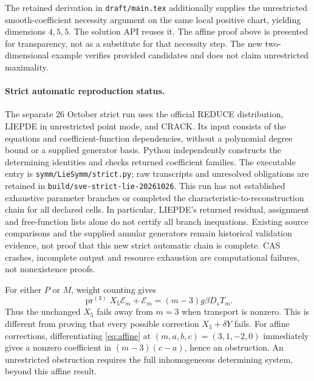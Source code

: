 \documentclass[11pt,a4paper,oneside]{report}
\numberwithin{equation}{chapter}
\newcommand{\E}{\mathcal E}
\newcommand{\pr}{\operatorname{pr}}
\DeclareRobustCommand{\code}[1]{\nolinkurl{#1}}
\begin{document}
The retained derivation in \code{draft/main.tex} additionally supplies the
unrestricted smooth-coefficient necessity argument on the same local positive
chart, yielding dimensions $4,5,5$. The solution API reuses it. The affine
proof above is presented for transparency, not as a substitute for that
necessity step. The new two-dimensional example verifies provided candidates
and does not claim unrestricted maximality.

\paragraph{Strict automatic reproduction status.}
The separate 26 October strict run uses the official REDUCE distribution,
LIEPDE in unrestricted point mode, and CRACK. Its input consists of the
equations and coefficient-function dependencies, without a polynomial
degree bound or a supplied generator basis. Python independently constructs
the determining identities and checks returned coefficient families.
The executable entry is \code{symm/LieSymm/strict.py}; raw transcripts and
unresolved obligations are retained in \code{build/sve-strict-lie-20261026}.
This run has not established exhaustive parameter branches or completed the
characteristic-to-reconstruction chain for all declared cells. In particular,
LIEPDE's returned residual, assignment and free-function lists alone do not
certify all branch inequations. Existing source comparisons and the supplied
annular generators remain historical validation evidence, not proof that
this new strict automatic chain is complete. CAS crashes, incomplete output
and resource exhaustion are computational failures, not nonexistence proofs.



For either $P$ or $M$, weight counting gives
\begin{equation}\label{eq:breaking}
\pr^{(3)}X_5\E_m+\E_m=(m-3)g\beta D_sT_m.
\end{equation}
Thus the unchanged $X_5$ fails away from $m=3$ when transport is nonzero. This is different from proving that every possible correction $X_5+\delta Y$ fails. For affine corrections, differentiating \eqref{eq:affine} at $(m,a,b,c)=(3,1,-2,0)$ immediately gives a nonzero coefficient in $(m-3)(c-a)$, hence an obstruction. An unrestricted obstruction requires the full inhomogeneous determining system, beyond this affine result.
\end{document}
